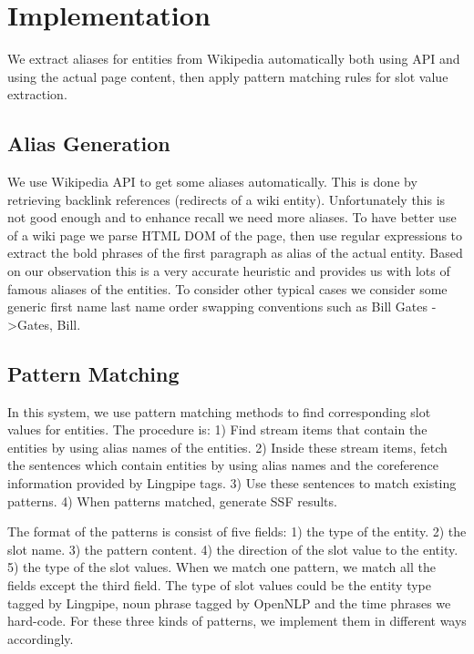 

\section{Implementation}

We extract aliases for entities from Wikipedia automatically both using API 
and using the actual page content, then apply pattern matching rules for slot 
value extraction. 

\subsection{Alias Generation}

We use Wikipedia API to get some aliases automatically. This is done by 
retrieving backlink references (redirects of a wiki entity). Unfortunately 
this is not good enough and to enhance recall we need more aliases. To have 
better use of a wiki page we parse HTML DOM of the page, then use regular 
expressions to extract the bold phrases of the first paragraph as alias of the 
actual entity. Based on our observation this is a very accurate heuristic and 
provides us with lots of famous aliases of the entities. To consider other 
typical cases we consider some generic first name last name order swapping 
conventions such as Bill Gates -\textgreater Gates, Bill.  

\subsection{Pattern Matching}

In this system, we use pattern matching methods to find corresponding slot 
values for entities. The procedure is: 1) Find stream items that contain the 
entities by using alias names of the entities. 2) Inside these stream items, 
fetch the sentences which contain entities by using alias names and the 
coreference information provided by Lingpipe tags. 3) Use these sentences to 
match existing patterns. 4) When patterns matched, generate SSF results.

The format of the patterns is consist of five fields:
1) the type of the entity. 
2) the slot name.
3) the pattern content.
4) the direction of the slot value to the entity.
5) the type of the slot values. When we match one pattern, we match all the 
fields except the third field. The type of slot values could be the entity 
type tagged by Lingpipe, noun phrase tagged by OpenNLP and the time phrases we 
hard-code. For these three kinds of patterns, we implement them in different 
ways accordingly. 

